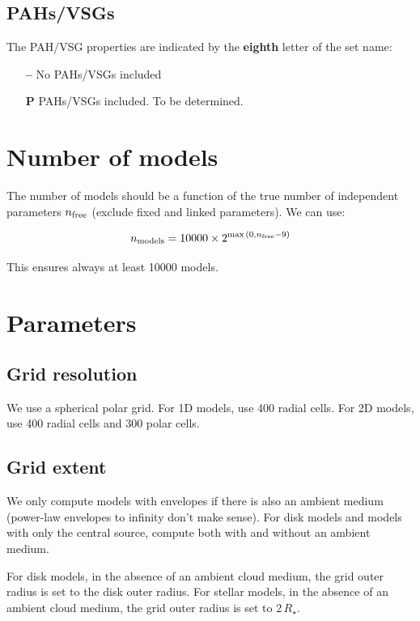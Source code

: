 \documentclass[10pt]{article}
\begin{document}
\subsection{PAHs/VSGs}

The PAH/VSG properties are indicated by the \textbf{eighth} letter of the set name:

\begin{itemize}

\item[\textbf{--}] No PAHs/VSGs included

\item[\textbf{P}] PAHs/VSGs included. To be determined.
      
\end{itemize}

\section{Number of models}

The number of models should be a function of the true number of independent parameters $n_{\rm free}$ (exclude fixed and linked parameters). We can use:

$$
n_{\rm models} = 10000 \times 2^{\max{(0, n_{\rm free}-9)}}
$$

This ensures always at least 10000 models.

\section{Parameters}

\subsection{Grid resolution}

We use a spherical polar grid. For 1D models, use 400 radial cells. For 2D models, use 400 radial cells and 300 polar cells.

\subsection{Grid extent}

We only compute models with envelopes if there is also an ambient medium (power-law envelopes to infinity don't make sense). For disk models and models with only the central source, compute both with and without an ambient medium.

For disk models, in the absence of an ambient cloud medium, the grid outer radius is set to the disk outer radius. For stellar models, in the absence of an ambient cloud medium, the grid outer radius is set to 2\,$R_\star$.
\end{document}
